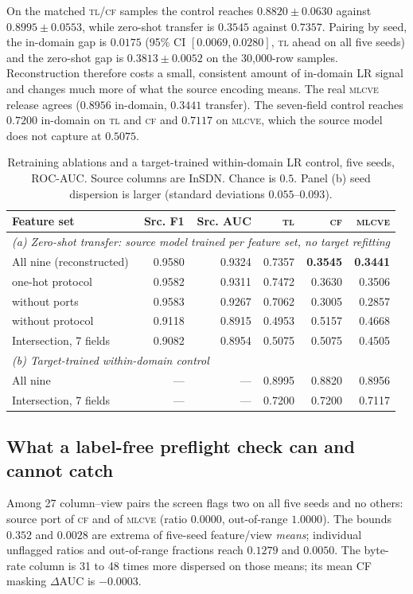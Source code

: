 \documentclass[conference,a4paper]{IEEEtran}
\begin{document}
On the matched \textsc{tl}/\textsc{cf} samples the control reaches $0.8820\pm0.0630$ against $0.8995\pm0.0553$, while zero-shot transfer is $0.3545$ against $0.7357$. Pairing by seed, the in-domain gap is $0.0175$ (95\% CI $[0.0069,0.0280]$, \textsc{tl} ahead on all five seeds) and the zero-shot gap is $0.3813\pm0.0052$ on the 30,000-row samples. Reconstruction therefore costs a small, consistent amount of in-domain LR signal and changes much more of what the source encoding means. The real \textsc{mlcve} release agrees ($0.8956$ in-domain, $0.3441$ transfer). The seven-field control reaches $0.7200$ in-domain on \textsc{tl} and \textsc{cf} and $0.7117$ on \textsc{mlcve}, which the source model does not capture at $0.5075$.
\begin{table}[t]\caption{Retraining ablations and a target-trained within-domain LR control, five seeds, ROC-AUC. Source columns are InSDN. Chance is $0.5$. Panel (b) seed dispersion is larger (standard deviations $0.055$--$0.093$).}\label{tab:ablation}\centering\scriptsize\setlength{\tabcolsep}{3pt}
\begin{tabular}{lrrrrr}\toprule
Feature set&Src. F1&Src. AUC&\textsc{tl}&\textsc{cf}&\textsc{mlcve}\\\midrule
\multicolumn{6}{l}{\textit{(a) Zero-shot transfer: source model trained per feature set, no target refitting}}\\
All nine (reconstructed)&0.9580&0.9324&0.7357&\textbf{0.3545}&\textbf{0.3441}\\
\quad one-hot protocol&0.9582&0.9311&0.7472&0.3630&0.3506\\
\quad without ports&0.9583&0.9267&0.7062&0.3005&0.2857\\
\quad without protocol&0.9118&0.8915&0.4953&0.5157&0.4668\\
Intersection, 7 fields&0.9082&0.8954&0.5075&0.5075&0.4505\\\midrule
\multicolumn{6}{l}{\textit{(b) Target-trained within-domain control}}\\
All nine&---&---&0.8995&0.8820&0.8956\\
Intersection, 7 fields&---&---&0.7200&0.7200&0.7117\\\bottomrule
\end{tabular}\end{table}

\subsection{What a label-free preflight check can and cannot catch}\label{sec:screen}
Among 27 column--view pairs the screen flags two on all five seeds and no others: source port of \textsc{cf} and of \textsc{mlcve} (ratio $0.0000$, out-of-range $1.0000$). The bounds $0.352$ and $0.0028$ are extrema of five-seed feature/view \emph{means}; individual unflagged ratios and out-of-range fractions reach $0.1279$ and $0.0050$. The byte-rate column is 31 to 48 times more dispersed on those means; its mean CF masking $\Delta$AUC is $-0.0003$.
\end{document}
